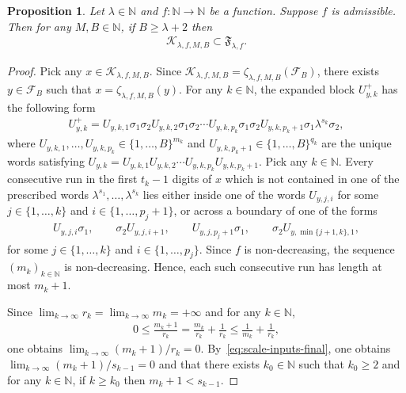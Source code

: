 \documentclass[10pt,a4paper]{amsart}
\newtheorem{prop}{Proposition}
\begin{document}
\begin{prop}
\label{prop:run-control-final}
Let $\lambda\in\mathbb{N}$ and $f:\mathbb{N}\to\mathbb{N}$ be a function. Suppose $f$ is admissible. Then for any $M,B\in\mathbb{N}$, if $B\geq \lambda+2$ then
\begin{align*}
    \mathcal{K}_{\lambda,f,M,B}\subset \mathfrak{F}_{\lambda,f}.
\end{align*}
\end{prop}
\begin{proof}
Pick any $x\in \mathcal{K}_{\lambda,f,M,B}$. Since $\mathcal{K}_{\lambda,f,M,B}=\zeta_{\lambda,f,M,B}(\mathcal{F}_B)$, there exists $y\in \mathcal{F}_B$ such that $x=\zeta_{\lambda,f,M,B}(y)$. For any $k\in\mathbb{N}$, the expanded block $U^+_{y,k}$ has the following form
\begin{align*}
    U^+_{y,k}
    =U_{y,k,1}\sigma_1\sigma_2U_{y,k,2}\sigma_1\sigma_2\cdots U_{y,k,p_k}\sigma_1\sigma_2U_{y,k,p_k+1}\sigma_1\lambda^{s_k}\sigma_2,
\end{align*}
where $U_{y,k,1},\dots,U_{y,k,p_k}\in \{1,\dots,B\}^{m_k}$ and $U_{y,k,p_k+1}\in \{1,\dots,B\}^{q_k}$ are the unique words satisfying $U_{y,k}=U_{y,k,1}U_{y,k,2}\cdots U_{y,k,p_k}U_{y,k,p_k+1}$. Pick any $k\in\mathbb{N}$. Every consecutive run in the first $t_k-1$ digits of $x$ which is not contained in one of the prescribed words $\lambda^{s_1},\ldots,\lambda^{s_k}$ lies either inside one of the words $U_{y,j,i}$ for some $j\in\{1,\ldots,k\}$ and $i\in\{1,\ldots,p_j+1\}$, or across a boundary of one of the forms
\begin{align*}
    U_{y,j,i}\sigma_1,\qquad
    \sigma_2U_{y,j,i+1},\qquad
    U_{y,j,p_j+1}\sigma_1,\qquad
    \sigma_2U_{y,\min\{j+1,k\},1},
\end{align*}
for some $j\in\{1,\ldots,k\}$ and $i\in\{1,\ldots,p_j\}$. Since $f$ is non-decreasing, the sequence $(m_k)_{k\in\mathbb{N}}$ is non-decreasing. Hence, each such consecutive run has length at most $m_k+1$. 

Since $\lim_{k\to\infty}r_k=\lim_{k\to\infty}m_k=+\infty$ and for any $k\in\mathbb{N}$, 
\begin{align*}
    0
    \leq \frac{m_k+1}{r_k}=\frac{m_k}{r_k}+\frac{1}{r_k}
    \leq \frac{1}{m_k}+\frac{1}{r_k},
\end{align*}
one obtains $\lim_{k\to\infty}{(m_k+1)}/{r_k}=0$. By~\eqref{eq:scale-inputs-final}, one obtains $\lim_{k\to\infty}{(m_k+1)}/{s_{k-1}}=0$ and that there exists $k_0\in\mathbb{N}$ such that $k_0\geq2$ and for any $k\in\mathbb{N}$, if $k\geq k_0$ then $m_k+1<s_{k-1}$. 


\end{proof}
\end{document}
